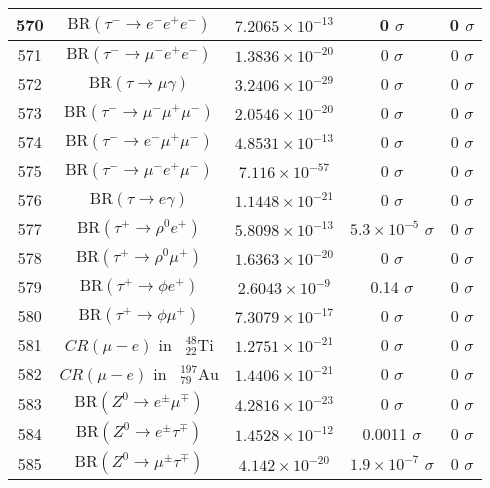 \begin{longtable}{|c|c|c|c|c|}
570 &	 $\mathrm{BR}(\tau^-\to e^-e^+e^-)$ &	 $7.2065\times 10^{-13}$ &	 0 $ \sigma$ &	 0 $ \sigma$ \\ \hline
571 &	 $\mathrm{BR}(\tau^-\to \mu^-e^+e^-)$ &	 $1.3836\times 10^{-20}$ &	 0 $ \sigma$ &	 0 $ \sigma$ \\ \hline
572 &	 $\mathrm{BR}(\tau\to \mu\gamma)$ &	 $3.2406\times 10^{-29}$ &	 0 $ \sigma$ &	 0 $ \sigma$ \\ \hline
573 &	 $\mathrm{BR}(\tau^-\to \mu^-\mu^+\mu^-)$ &	 $2.0546\times 10^{-20}$ &	 0 $ \sigma$ &	 0 $ \sigma$ \\ \hline
574 &	 $\mathrm{BR}(\tau^-\to e^-\mu^+\mu^-)$ &	 $4.8531\times 10^{-13}$ &	 0 $ \sigma$ &	 0 $ \sigma$ \\ \hline
575 &	 $\mathrm{BR}(\tau^-\to \mu^-e^+\mu^-)$ &	 $7.116\times 10^{-57}$ &	 0 $ \sigma$ &	 0 $ \sigma$ \\ \hline
576 &	 $\mathrm{BR}(\tau\to e\gamma)$ &	 $1.1448\times 10^{-21}$ &	 0 $ \sigma$ &	 0 $ \sigma$ \\ \hline
577 &	 $\mathrm{BR}(\tau^+\to \rho^0 e^+)$ &	 $5.8098\times 10^{-13}$ &	 \cellcolor{red!0}$5.3\times 10^{-5}$ $ \sigma$ &	 0 $ \sigma$ \\ \hline
578 &	 $\mathrm{BR}(\tau^+\to \rho^0\mu^+)$ &	 $1.6363\times 10^{-20}$ &	 0 $ \sigma$ &	 0 $ \sigma$ \\ \hline
579 &	 $\mathrm{BR}(\tau^+\to \phi e^+)$ &	 $2.6043\times 10^{-9}$ &	 \cellcolor{red!6}0.14 $ \sigma$ &	 0 $ \sigma$ \\ \hline
580 &	 $\mathrm{BR}(\tau^+\to \phi\mu^+)$ &	 $7.3079\times 10^{-17}$ &	 0 $ \sigma$ &	 0 $ \sigma$ \\ \hline
581 &	 $CR(\mu - e)$ in $\phantom k^{48}_{22} \mathrm{Ti}$ &	 $1.2751\times 10^{-21}$ &	 0 $ \sigma$ &	 0 $ \sigma$ \\ \hline
582 &	 $CR(\mu - e)$ in $\phantom k^{197}_{79} \mathrm{Au}$ &	 $1.4406\times 10^{-21}$ &	 0 $ \sigma$ &	 0 $ \sigma$ \\ \hline
583 &	 $\mathrm{BR}(Z^0\to  e^\pm\mu^\mp)$ &	 $4.2816\times 10^{-23}$ &	 0 $ \sigma$ &	 0 $ \sigma$ \\ \hline
584 &	 $\mathrm{BR}(Z^0\to  e^\pm\tau^\mp)$ &	 $1.4528\times 10^{-12}$ &	 \cellcolor{red!0}0.0011 $ \sigma$ &	 0 $ \sigma$ \\ \hline
585 &	 $\mathrm{BR}(Z^0\to \mu^\pm\tau^\mp)$ &	 $4.142\times 10^{-20}$ &	 \cellcolor{red!0}$1.9\times 10^{-7}$ $ \sigma$ &	 0 $ \sigma$ \\ \hline
\end{longtable}